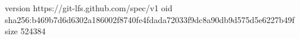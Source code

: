 version https://git-lfs.github.com/spec/v1
oid sha256:b469b7d6d6302a186002f8740fe4fdada72033f9dc8a90db9d575d5e6227b49f
size 524384
